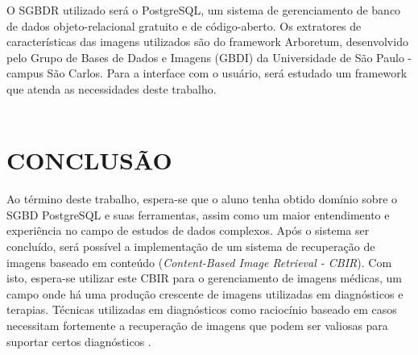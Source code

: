 O SGBDR utilizado será o PostgreSQL, um sistema de gerenciamento de banco de dados objeto-relacional gratuito e de código-aberto. Os extratores de características das imagens utilizados são do framework Arboretum, desenvolvido
pelo Grupo de Bases de Dados e Imagens (GBDI) da Universidade de São Paulo - campus São Carlos. Para a interface com o usuário, será estudado um framework que atenda as necessidades deste trabalho. \\ \\

% 
% 
% 
% 
% 



 
{\let\clearpage\relax \chapter{CONCLUSÃO}} %
\label{chap:conclusao}

Ao término deste trabalho, espera-se que o aluno tenha obtido domínio sobre o SGBD PostgreSQL e suas ferramentas, assim como um maior entendimento e experiência no campo de estudos de dados complexos.
Após o sistema ser concluído, será possível a implementação de um sistema de recuperação de imagens baseado em conteúdo (\textit{Content-Based Image Retrieval - CBIR}). Com isto, espera-se utilizar
este CBIR para o gerenciamento de imagens médicas, um campo onde há uma produção crescente de imagens utilizadas em diagnósticos e terapias. Técnicas utilizadas em diagnósticos como raciocínio baseado
em casos necessitam fortemente a recuperação de imagens que podem ser valiosas para suportar certos diagnósticos \cite{Long2009}. \\ \\


